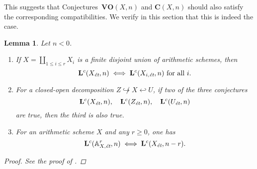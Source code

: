 \documentclass[10pt,a4paper,oneside,draft]{article}
\renewcommand{\AA}{\mathbb{A}}
\newcommand{\et}{\text{\it \'{e}t}}
\theoremstyle{myplain}
\newtheorem{lemma}[theorem]{Lemma}
\theoremstyle{mydefinition}
\numberwithin{equation}{section}
\begin{document}
This suggests that Conjectures~$\mathbf{VO} (X,n)$ and $\mathbf{C} (X,n)$ should
also satisfy the corresponding compatibilities. We verify in this section that
this is indeed the case.

\begin{lemma}
  \label{lemma:compatibility-of-Lc(X,n)}
  Let $n < 0$.

  \begin{enumerate}
  \item[1)] If $X = \coprod_{1 \le i \le r} X_i$ is a finite disjoint union of
    arithmetic schemes, then
    $$\mathbf{L}^c (X_\et,n) \iff \mathbf{L}^c (X_{i,\et},n)\text{ for all }i.$$

  \item[2)] For a closed-open decomposition
    $Z \not\hookrightarrow X \hookleftarrow U$, if two of the three conjectures
    \[ \mathbf{L}^c (X_\et,n), \quad
      \mathbf{L}^c (Z_\et,n), \quad
      \mathbf{L}^c (U_\et, n) \]
    are true, then the third is also true.

  \item[3)] For an arithmetic scheme $X$ and any $r \ge 0$, one has
    $$\mathbf{L}^c (\AA^r_{X,\et}, n) \iff \mathbf{L}^c (X_\et, n-r).$$
  \end{enumerate}

  \begin{proof}
    See the proof of \cite[Proposition~5.10]{Morin-2014}.
  \end{proof}
\end{lemma}
\end{document}
